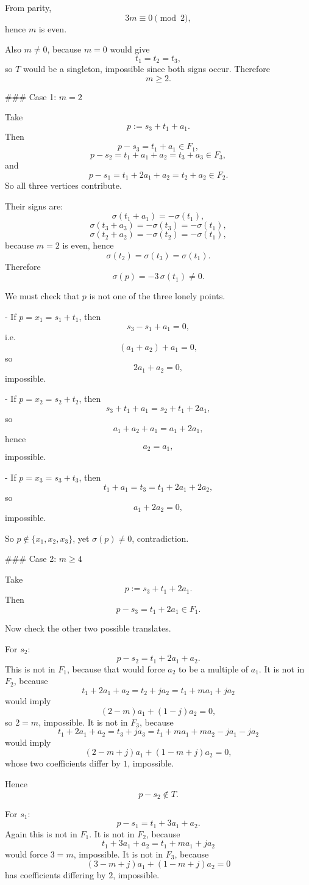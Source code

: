 From parity,
\[
3m\equiv 0 \pmod 2,
\]
hence \(m\) is even.

Also \(m\neq 0\), because \(m=0\) would give
\[
t_1=t_2=t_3,
\]
so \(T\) would be a singleton, impossible since both signs occur. Therefore
\[
m\ge 2.
\]

### Case 1: \(m=2\)

Take
\[
p:=s_3+t_1+a_1.
\]
Then
\[
p-s_3=t_1+a_1\in F_1,
\]
\[
p-s_2=t_1+a_1+a_2=t_3+a_3\in F_3,
\]
and
\[
p-s_1=t_1+2a_1+a_2=t_2+a_2\in F_2.
\]
So all three vertices contribute.

Their signs are:
\[
\sigma(t_1+a_1)=-\sigma(t_1),
\]
\[
\sigma(t_3+a_3)=-\sigma(t_3)=-\sigma(t_1),
\]
\[
\sigma(t_2+a_2)=-\sigma(t_2)=-\sigma(t_1),
\]
because \(m=2\) is even, hence
\[
\sigma(t_2)=\sigma(t_3)=\sigma(t_1).
\]
Therefore
\[
\sigma(p)=-3\,\sigma(t_1)\neq 0.
\]

We must check that \(p\) is not one of the three lonely points.

- If \(p=x_1=s_1+t_1\), then
  \[
  s_3-s_1+a_1=0,
  \]
  i.e.
  \[
  (a_1+a_2)+a_1=0,
  \]
  so
  \[
  2a_1+a_2=0,
  \]
  impossible.

- If \(p=x_2=s_2+t_2\), then
  \[
  s_3+t_1+a_1=s_2+t_1+2a_1,
  \]
  so
  \[
  a_1+a_2+a_1=a_1+2a_1,
  \]
  hence
  \[
  a_2=a_1,
  \]
  impossible.

- If \(p=x_3=s_3+t_3\), then
  \[
  t_1+a_1=t_3=t_1+2a_1+2a_2,
  \]
  so
  \[
  a_1+2a_2=0,
  \]
  impossible.

So \(p\notin \{x_1,x_2,x_3\}\), yet \(\sigma(p)\neq 0\), contradiction.

### Case 2: \(m\ge 4\)

Take
\[
p:=s_3+t_1+2a_1.
\]
Then
\[
p-s_3=t_1+2a_1\in F_1.
\]

Now check the other two possible translates.

For \(s_2\):
\[
p-s_2=t_1+2a_1+a_2.
\]
This is not in \(F_1\), because that would force \(a_2\) to be a multiple of \(a_1\).
It is not in \(F_2\), because
\[
t_1+2a_1+a_2=t_2+ja_2=t_1+ma_1+ja_2
\]
would imply
\[
(2-m)a_1+(1-j)a_2=0,
\]
so \(2=m\), impossible.
It is not in \(F_3\), because
\[
t_1+2a_1+a_2=t_3+ja_3=t_1+ma_1+ma_2-j a_1-j a_2
\]
would imply
\[
(2-m+j)a_1+(1-m+j)a_2=0,
\]
whose two coefficients differ by \(1\), impossible.

Hence
\[
p-s_2\notin T.
\]

For \(s_1\):
\[
p-s_1=t_1+3a_1+a_2.
\]
Again this is not in \(F_1\).
It is not in \(F_2\), because
\[
t_1+3a_1+a_2=t_1+ma_1+ja_2
\]
would force \(3=m\), impossible.
It is not in \(F_3\), because
\[
(3-m+j)a_1+(1-m+j)a_2=0
\]
has coefficients differing by \(2\), impossible.

